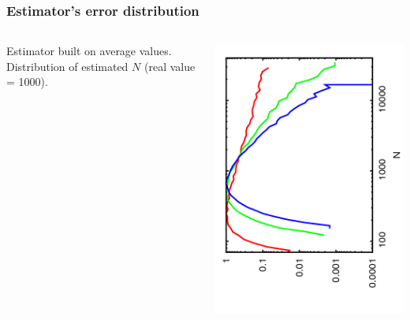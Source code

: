 \documentclass[14pt,green]{beamer}
\begin{document}
\begin{frame}
  \frametitle{Estimator's error distribution}
  \begin{columns}
    \begin{column}{0.4\textwidth}
       Estimator built on average values. Distribution of estimated $N$ (real value = 1000).
    \end{column}
    \begin{column}{0.6\textwidth}
  \begin{center}
  \includegraphics[angle=270, width=1\textwidth]{est_avg.png}                                                             
  \end{center}
    \end{column}
  \end{columns}

\end{frame}
\end{document}
